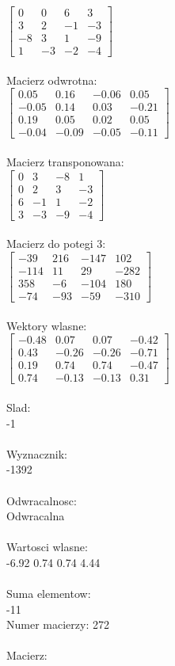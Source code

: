 \documentclass[a4paper,12pt]{article}
\begin{document}
$\begin{bmatrix} 0&0&6&3\\3&2&-1&-3\\-8&3&1&-9\\1&-3&-2&-4 \end{bmatrix}$
\\
\\
Macierz odwrotna:\\

$\begin{bmatrix} 0.05&0.16&-0.06&0.05\\-0.05&0.14&0.03&-0.21\\0.19&0.05&0.02&0.05\\-0.04&-0.09&-0.05&-0.11 \end{bmatrix}$
\\
\\
Macierz transponowana:\\

$\begin{bmatrix} 0&3&-8&1\\0&2&3&-3\\6&-1&1&-2\\3&-3&-9&-4 \end{bmatrix}$
\\
\\
Macierz do potegi 3:\\

$\begin{bmatrix} -39&216&-147&102\\-114&11&29&-282\\358&-6&-104&180\\-74&-93&-59&-310 \end{bmatrix}$
\\
\\
Wektory wlasne:\\

$\begin{bmatrix} -0.48&0.07&0.07&-0.42\\0.43&-0.26&-0.26&-0.71\\0.19&0.74&0.74&-0.47\\0.74&-0.13&-0.13&0.31 \end{bmatrix}$
\\
\\
Slad:\\
-1
\\
\\
Wyznacznik:\\
-1392
\\
\\
Odwracalnosc:\\
Odwracalna
\\
\\
Wartosci wlasne:\\
-6.92 0.74 0.74 4.44
\\
\\
Suma elementow:\\
-11
\\
\newpage
Numer macierzy:
272
\\
\\
Macierz:\\
\end{document}
